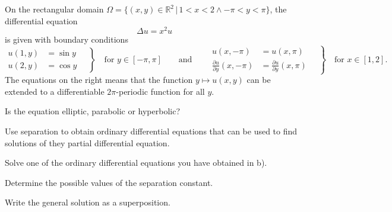 On the rectangular domain
$\Omega = \{(x,y)\in\mathbb R^2\,|\, 1<x<2\wedge -\pi<y<\pi\}$,
the differential equation
\begin{equation}
\Delta u = x^2u
\label{40000025:eqn}
\end{equation}
is given with boundary conditions
\begin{equation}
\left.
\begin{aligned}
u(1,y) &= \sin y\\
u(2,y) &= \cos y
\end{aligned}
\quad
\right\}
\quad
\text{for $y\in[-\pi,\pi]$}
\qquad
\text{and}
\qquad
\left.
\begin{aligned}
u(x,-\pi) &= u(x,\pi)\\
\frac{\partial u}{\partial y}(x,-\pi) &= \frac{\partial u}{\partial y}(x,\pi)
\end{aligned}
\quad\right\}
\quad
\text{for $x\in[1,2]$.}
\end{equation}
The equations on the right means that the function $y\mapsto u(x,y)$
can be extended to a differentiable $2\pi$-periodic function for all $y$.

\begin{teilaufgaben}
\item
Is the equation elliptic, parabolic or hyperbolic?
\item
Use separation to obtain ordinary differential equations that can be
used to find solutions of they partial differential equation.
\item
Solve one of the ordinary differential equations you have obtained in b).
\item
Determine the possible values of the separation constant.
\item
Write the general solution as a superposition.
\end{teilaufgaben}

